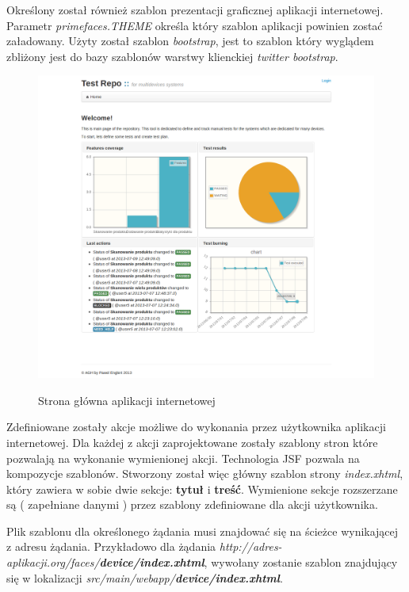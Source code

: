 Określony został również szablon prezentacji graficznej aplikacji internetowej. Parametr \textit{primefaces.THEME} określa który szablon aplikacji powinien zostać załadowany. Użyty został szablon \textit{bootstrap}, jest to szablon który wyglądem zbliżony jest do bazy szablonów warstwy klienckiej \textit{twitter bootstrap}.
\begin{figure}
  \begin{center}
    \includegraphics[scale=0.4]{img/screen/Welcome.png}
    \label{fig:stronaGlowna}
    \caption{Strona główna aplikacji internetowej}
  \end{center}
\end{figure}

Zdefiniowane zostały akcje możliwe do wykonania przez użytkownika aplikacji internetowej. Dla każdej z akcji zaprojektowane zostały szablony stron które pozwalają na wykonanie wymienionej akcji. Technologia JSF pozwala na kompozycje szablonów. Stworzony został więc główny szablon strony \textit{index.xhtml}, który zawiera w sobie dwie sekcje: \textbf{tytuł} i \textbf{treść}. Wymienione sekcje rozszerzane są ( zapełniane danymi ) przez szablony zdefiniowane dla akcji użytkownika.

Plik szablonu dla określonego żądania musi znajdować się na ścieżce wynikającej z adresu żądania. Przykładowo dla żądania \textit{http://adres-aplikacji.org/faces/\textbf{device/index.xhtml}}, wywołany zostanie szablon znajdujący się w lokalizacji \textit{src/main/webapp/\textbf{device/index.xhtml}}.

